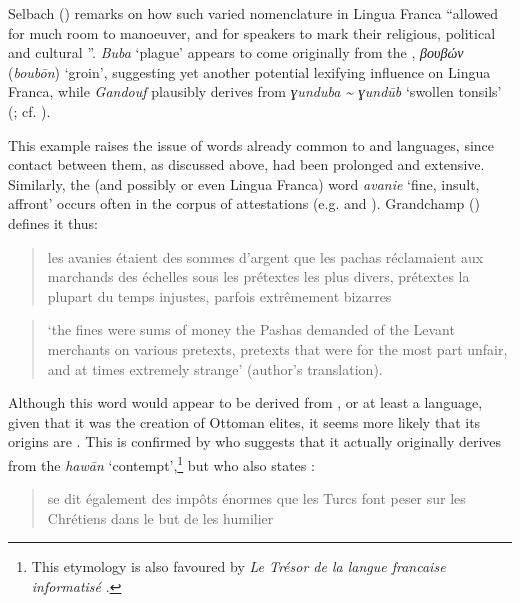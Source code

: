 \documentclass[output=paper]{langsci/langscibook}
\begin{document}
	Selbach (\citeyear[44]{Selbach2008}) remarks on how such varied nomenclature in Lingua Franca ``allowed for much room to manoeuver, and for speakers to mark their religious, political and cultural ''. \textit{Buba} ‘plague’ appears to come originally from the , \textit{βουβών} (\textit{boubōn}) ‘groin’, suggesting yet another potential lexifying influence on Lingua Franca, while \textit{Gandouf} plausibly derives from  \textit{ɣunduba {\textasciitilde} ɣundūb} ‘swollen tonsils’ (\citealt[72]{Schuchardt1909}; cf. \citealt[45]{Selbach2008}). 
	
	This example raises the issue of words already common to  and  languages, since contact between them, as discussed above, had been prolonged and extensive. Similarly, the  (and possibly  or even Lingua Franca) word \textit{avanie} ‘fine, insult, affront’ occurs often in the corpus of attestations (e.g. \citealt{Pananti1841} and \citealt{Grandchamp1920}). Grandchamp (\citeyear[xiii]{Grandchamp1920}) defines it thus: 
	
	\begin{quote}
		les avanies étaient des sommes d'argent que les pachas réclamaient aux marchands des échelles sous les prétextes les plus divers, prétextes la plupart du temps injustes, parfois extrêmement bizarres
	\end{quote}
	
	\begin{quote}
		‘the fines were sums of money the Pashas demanded of the Levant merchants on various pretexts, pretexts that were for the most part unfair, and at times extremely strange’ (author's translation).
	\end{quote}
	
	Although this word would appear to be derived from , or at least a  language, given that it was the creation of Ottoman elites, it seems more likely that its origins are . This is confirmed by \citet{Pihan1847} who suggests that it actually originally derives from the  \textit{hawān} ‘contempt’,\footnote{This etymology is also favoured by \textit{Le Trésor de la langue francaise informatisé} \citep{Dendien1994}.} but who also states \citep[46]{Pihan1847}:
	
	\begin{quote}
		se dit également des impôts énormes que les Turcs font peser sur les Chrétiens dans le but de les humilier
	\end{quote}
	
\end{document}
